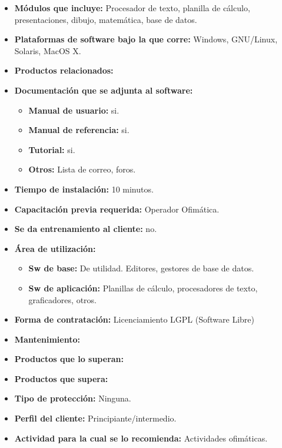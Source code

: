 \begin{itemize}
  \item \textbf{Módulos que incluye:} Procesador de texto, planilla de cálculo, presentaciones, dibujo, matemática, base de datos.
  \item \textbf{Plataformas de software bajo la que corre:} Windows, GNU/Linux, Solaris, MacOS X.
  \item \textbf{Productos relacionados:}

  \item \textbf{Documentación que se adjunta al software:}
    \begin{itemize}
      \item \textbf{Manual de usuario:} si.
      \item \textbf{Manual de referencia:} si.
      \item \textbf{Tutorial:} si.
      \item \textbf{Otros:} Lista de correo, foros.
    \end{itemize}

  \item \textbf{Tiempo de instalación:} 10 minutos.
  \item \textbf{Capacitación previa requerida:} Operador Ofimática.
  \item \textbf{Se da entrenamiento al cliente:} no.

  \item \textbf{Área de utilización:}
    \begin{itemize}
      \item \textbf{Sw de base:} De utilidad. Editores, gestores de base de datos.
      \item \textbf{Sw de aplicación:} Planillas de cálculo, procesadores de texto, graficadores, otros.
    \end{itemize}

  \item \textbf{Forma de contratación:} Licenciamiento LGPL (Software Libre)
  \item \textbf{Mantenimiento:} 
  \item \textbf{Productos que lo superan:} 
  \item \textbf{Productos que supera:} 
  \item \textbf{Tipo de protección:} Ninguna.
  \item \textbf{Perfil del cliente:} Principiante/intermedio.
  \item \textbf{Actividad para la cual se lo recomienda:} Actividades ofimáticas.
\end{itemize}

